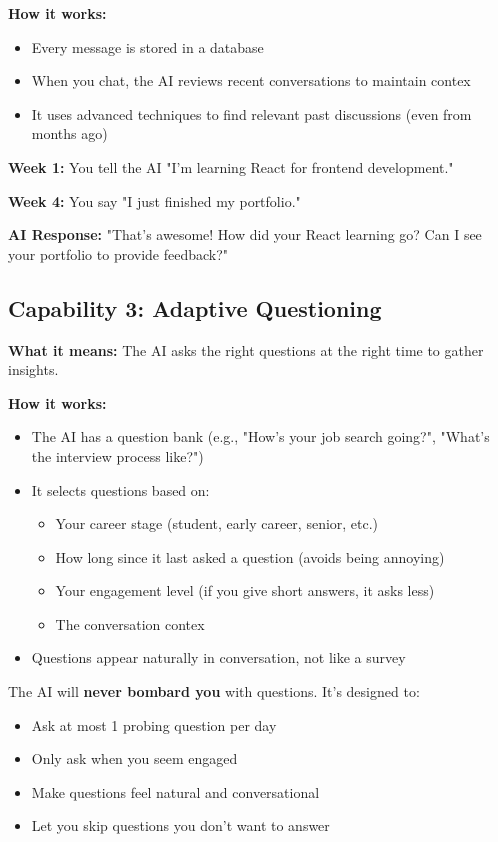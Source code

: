 \documentclass[12pt,a4paper]{article}
\begin{document}
\textbf{How it works:}
\begin{itemize}
  \item Every message is stored in a database
  \item When you chat, the AI reviews recent conversations to maintain contex
  \item It uses advanced techniques to find relevant past discussions (even from months ago)
\end{itemize}

\begin{example}
\textbf{Week 1:} You tell the AI "I'm learning React for frontend development."

\textbf{Week 4:} You say "I just finished my portfolio."

\textbf{AI Response:} "That's awesome! How did your React learning go? Can I see your portfolio to provide feedback?"
\end{example}

\subsection{Capability 3: Adaptive Questioning}

\textbf{What it means:} The AI asks the right questions at the right time to gather insights.

\textbf{How it works:}
\begin{itemize}
  \item The AI has a question bank (e.g., "How's your job search going?", "What's the interview process like?")
  \item It selects questions based on:
    \begin{itemize}
      \item Your career stage (student, early career, senior, etc.)
      \item How long since it last asked a question (avoids being annoying)
      \item Your engagement level (if you give short answers, it asks less)
      \item The conversation contex
    \end{itemize}
  \item Questions appear naturally in conversation, not like a survey
\end{itemize}

\begin{warning}
The AI will \textbf{never bombard you} with questions. It's designed to:
\begin{itemize}
  \item Ask at most 1 probing question per day
  \item Only ask when you seem engaged
  \item Make questions feel natural and conversational
  \item Let you skip questions you don't want to answer
\end{itemize}
\end{warning}
\end{document}
